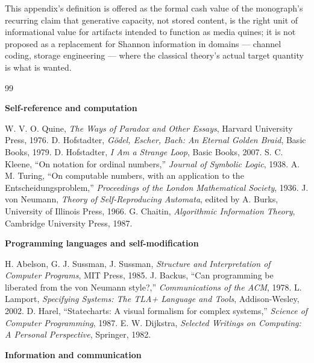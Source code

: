 \documentclass[11pt]{book}
\begin{document}
This appendix's definition is offered as the formal cash value of the monograph's recurring claim that generative capacity, not stored content, is the right unit of informational value for artifacts intended to function as media quines; it is not proposed as a replacement for Shannon information in domains --- channel coding, storage engineering --- where the classical theory's actual target quantity is what is wanted.

\backmatter

\begin{thebibliography}{99}

\item[] \textbf{Self-reference and computation}

 W. V. O. Quine, \textit{The Ways of Paradox and Other Essays}, Harvard University Press, 1976.
 D. Hofstadter, \textit{G\"odel, Escher, Bach: An Eternal Golden Braid}, Basic Books, 1979.
 D. Hofstadter, \textit{I Am a Strange Loop}, Basic Books, 2007.
 S. C. Kleene, ``On notation for ordinal numbers,'' \textit{Journal of Symbolic Logic}, 1938.
 A. M. Turing, ``On computable numbers, with an application to the Entscheidungsproblem,'' \textit{Proceedings of the London Mathematical Society}, 1936.
 J. von Neumann, \textit{Theory of Self-Reproducing Automata}, edited by A. Burks, University of Illinois Press, 1966.
 G. Chaitin, \textit{Algorithmic Information Theory}, Cambridge University Press, 1987.

\item[] \textbf{Programming languages and self-modification}

 H. Abelson, G. J. Sussman, J. Sussman, \textit{Structure and Interpretation of Computer Programs}, MIT Press, 1985.
 J. Backus, ``Can programming be liberated from the von Neumann style?,'' \textit{Communications of the ACM}, 1978.
 L. Lamport, \textit{Specifying Systems: The TLA+ Language and Tools}, Addison-Wesley, 2002.
 D. Harel, ``Statecharts: A visual formalism for complex systems,'' \textit{Science of Computer Programming}, 1987.
 E. W. Dijkstra, \textit{Selected Writings on Computing: A Personal Perspective}, Springer, 1982.

\item[] \textbf{Information and communication}


\end{thebibliography}
\end{document}

